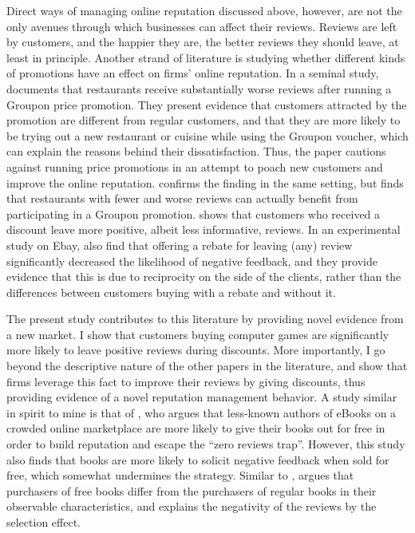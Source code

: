 \documentclass[12pt,pagebackref]{article}
\begin{document}
Direct ways of managing online reputation discussed above, however, are
not the only avenues through which businesses can affect their reviews.
Reviews are left by customers, and the happier they are, the better
reviews they should leave, at least in principle. Another strand of
literature is studying whether different kinds of promotions have an
effect on firms' online reputation. In a seminal study,
\citet{ByersEtAl12} documents that restaurants receive substantially
worse reviews after running a Groupon price promotion. They present
evidence that customers attracted by the promotion are different from
regular customers, and that they are more likely to be trying out a new
restaurant or cuisine while using the Groupon voucher, which can explain
the reasons behind their dissatisfaction. Thus, the paper cautions
against running price promotions in an attempt to poach new customers
and improve the online reputation. \citet{Li16} confirms the finding in
the same setting, but finds that restaurants with fewer and worse
reviews can actually benefit from participating in a Groupon promotion.
\citet{ZhuEtAl19} shows that customers who received a discount leave
more positive, albeit less informative, reviews. In an experimental
study on Ebay, \citet{CabralLi15} also find that offering a rebate for
leaving (any) review significantly decreased the likelihood of negative
feedback, and they provide evidence that this is due to reciprocity on
the side of the clients, rather than the differences between customers
buying with a rebate and without it.

The present study contributes to this literature by providing novel
evidence from a new market. I show that customers buying computer games
are significantly more likely to leave positive reviews during
discounts. More importantly, I go beyond the descriptive nature of the
other papers in the literature, and show that firms leverage this fact
to improve their reviews by giving discounts, thus providing evidence of
a novel reputation management behavior. A study similar in spirit to
mine is that of \citet{Zegners17}, who argues that less-known authors of
eBooks on a crowded online marketplace are more likely to give their
books out for free in order to build reputation and escape the ``zero
reviews trap''. However, this study also finds that books are more
likely to solicit negative feedback when sold for free, which somewhat
undermines the strategy. Similar to \citet{ByersEtAl12},
\citet{Zegners17} argues that purchasers of free books differ from the
purchasers of regular books in their observable characteristics, and
explains the negativity of the reviews by the selection effect.
\end{document}
